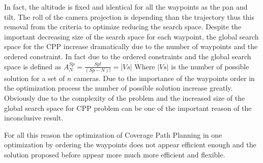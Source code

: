 \begin{itemize}
	 In fact, the altitude is fixed and identical for all the waypoints as the pan and tilt. The roll of the camera projection is depending than the trajectory thus this removal from the criteria to optimize reducing the search space.
		Despite the important decreasing size of the search space for each waypoint, the global search space for the CPP increase dramatically  due to the number of waypoints and the ordered constraint. In fact due to the ordered constraints and the global search space is defined as $A^{Sp}_{N}=\frac{Sp!}{(Sp-N)!} = |Vs|$
 Where $|Vs|$ is the number of possible solution for a set of $n$ cameras. Due to the importance of the waypoints order in the optimization process the number of possible solution increase greatly. Obviously due to the complexity of the problem and the increased size of the global search space for CPP problem  can be one of the important reason of the inconclusive result.
 \end{itemize}
		
For all this reason the  optimization of Coverage Path Planning  in one optimization by ordering the waypoints does not appear efficient enough and the solution proposed before appear more much more efficient and flexible.





